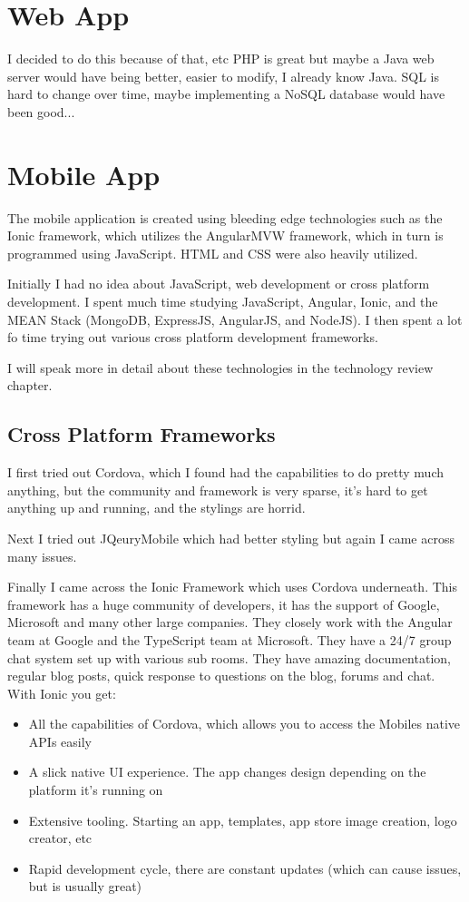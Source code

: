\section{Web App}

I decided to do this because of that, etc
PHP is great but maybe a Java web server would have being better, easier to modify, I already know Java.
SQL is hard to change over time, maybe implementing a NoSQL database would have been good...

\section{Mobile App}
The mobile application is created using bleeding edge technologies such as the Ionic framework, which utilizes the AngularMVW framework, which in turn is programmed using JavaScript. HTML and CSS were also heavily utilized.

Initially I had no idea about JavaScript, web development or cross platform development. I spent much time studying JavaScript, Angular, Ionic, and the MEAN Stack (MongoDB, ExpressJS, AngularJS, and NodeJS). I then spent a lot fo time trying out various cross platform development frameworks.

I will speak more in detail about these technologies in the technology review chapter.

\subsection{Cross Platform Frameworks}

I first tried out Cordova, which I found had the capabilities to do pretty much anything, but the community and framework is very sparse, it's hard to get anything up and running, and the stylings are horrid.
\cite{https://cordova.apache.org/}

Next I tried out JQeuryMobile which had better styling but again I came across many issues.
\cite{http://jquerymobile.com/}

Finally I came across the Ionic Framework which uses Cordova underneath. This framework has a huge community of developers, it has the support of Google, Microsoft and many other large companies. They closely work with the Angular team at Google and the TypeScript team at Microsoft. 
They have a 24/7 group chat system set up with various sub rooms. 
They have amazing documentation, regular blog posts, quick response to questions on the blog, forums and chat. 
With Ionic you get:
\begin{itemize}
\item All the capabilities of Cordova, which allows you to access the Mobiles native APIs easily
\item A slick native UI experience. The app changes design depending on the platform it's running on
\item Extensive tooling. Starting an app, templates, app store image creation, logo creator, etc
\item Rapid development cycle, there are constant updates (which can cause issues, but is usually great)
\end{itemize}
\cite{http://ionicframework.com/}


